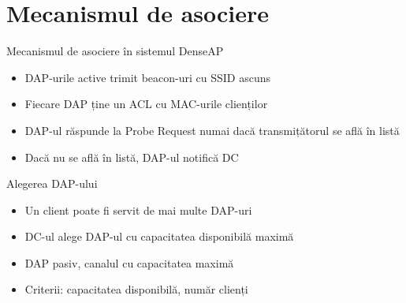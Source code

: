 \section{Mecanismul de asociere}

\begin{frame}{Mecanismul de asociere în sistemul DenseAP}
  \begin{itemize}
    \item DAP-urile active trimit beacon-uri cu SSID ascuns
    \item Fiecare DAP ține un ACL cu MAC-urile clienților
    \item DAP-ul răspunde la Probe Request numai dacă transmițătorul se află în listă
    \item Dacă nu se află în listă, DAP-ul notifică DC
  \end{itemize}
\end{frame}

\begin{frame}{Alegerea DAP-ului}
  \begin{itemize}
    \item Un client poate fi servit de mai multe DAP-uri
    \item DC-ul alege DAP-ul cu capacitatea disponibilă maximă
    \item DAP pasiv, canalul cu capacitatea maximă
    \item Criterii: capacitatea disponibilă, număr clienți
  \end{itemize}
\end{frame}

